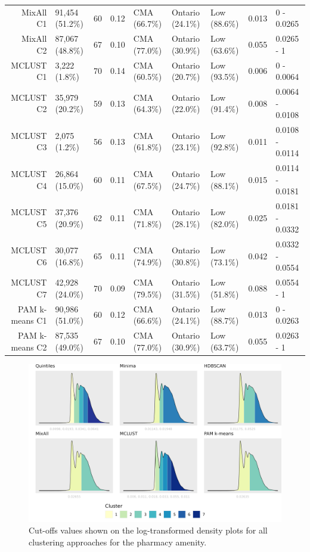 \documentclass[11pt, a4paper]{article}
\begin{document}
\begin{table}[H]
{\begin{tabular}{|r|llllllll|}
  MixAll C1 & 91,454 (51.2\%) & 60 & 0.12 & CMA (66.7\%) & Ontario (24.1\%) & Low (88.6\%) & 0.013 & 0 - 0.0265 \\
  MixAll C2 & 87,067 (48.8\%) & 67 & 0.10 & CMA (77.0\%) & Ontario (30.9\%) & Low (63.6\%) & 0.055 & 0.0265 - 1 \\
 \rowcolor{gray!25} MCLUST C1 & 3,222 (1.8\%) & 70 & 0.14 & CMA (60.5\%) & Ontario (20.7\%) & Low (93.5\%) & 0.006 & 0 - 0.0064 \\
 \rowcolor{gray!25} MCLUST C2 & 35,979 (20.2\%) & 59 & 0.13 & CMA (64.3\%) & Ontario (22.0\%) & Low (91.4\%) & 0.008 & 0.0064 - 0.0108 \\
 \rowcolor{gray!25} MCLUST C3 & 2,075 (1.2\%) & 56 & 0.13 & CMA (61.8\%) & Ontario (23.1\%) & Low (92.8\%) & 0.011 & 0.0108 - 0.0114 \\
 \rowcolor{gray!25} MCLUST C4 & 26,864 (15.0\%) & 60 & 0.11 & CMA (67.5\%) & Ontario (24.7\%) & Low (88.1\%) & 0.015 & 0.0114 - 0.0181 \\
 \rowcolor{gray!25} MCLUST C5 & 37,376 (20.9\%) & 62 & 0.11 & CMA (71.8\%) & Ontario (28.1\%) & Low (82.0\%) & 0.025 & 0.0181 - 0.0332 \\
 \rowcolor{gray!25} MCLUST C6 & 30,077 (16.8\%) & 65 & 0.11 & CMA (74.9\%) & Ontario (30.8\%) & Low (73.1\%) & 0.042 & 0.0332 - 0.0554 \\
 \rowcolor{gray!25} MCLUST C7 & 42,928 (24.0\%) & 70 & 0.09 & CMA (79.5\%) & Ontario (31.5\%) & Low (51.8\%) & 0.088 & 0.0554 - 1 \\
  PAM k-means C1 & 90,986 (51.0\%) & 60 & 0.12 & CMA (66.6\%) & Ontario (24.1\%) & Low (88.7\%) & 0.013 & 0 - 0.0263 \\
  PAM k-means C2 & 87,535 (49.0\%) & 67 & 0.10 & CMA (77.0\%) & Ontario (30.9\%) & Low (63.7\%) & 0.055 & 0.0263 - 1 \\
   \hline
\end{tabular}
}
\end{table}





\begin{figure}[H]
\centering
\includegraphics[width=\textwidth]{./cutoffs/by_amenity/Pharmacy_cutoffs.png}
\caption[Pharmacy cutoffs]{Cut-offs values shown on the log-transformed density plots for all clustering approaches for the pharmacy amenity.}\label{pharmacycutoffs}
\end{figure}
\end{document}

